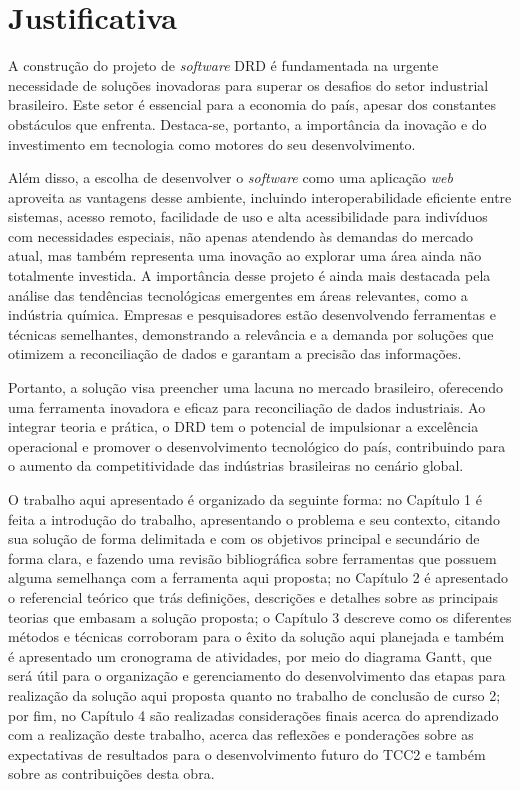 \section{Justificativa}

A construção do projeto de \textit{software} DRD é fundamentada na urgente necessidade de soluções inovadoras para superar os desafios do setor industrial brasileiro. Este setor é essencial para a economia do país, apesar dos constantes obstáculos que enfrenta. Destaca-se, portanto, a importância da inovação e do investimento em tecnologia como motores do seu desenvolvimento.

Além disso, a escolha de desenvolver o \textit{software} como uma aplicação \textit{web} aproveita as vantagens desse ambiente, incluindo interoperabilidade eficiente entre sistemas, acesso remoto, facilidade de uso e alta acessibilidade para indivíduos com necessidades especiais, não apenas atendendo às demandas do mercado atual, mas também representa uma inovação ao explorar uma área ainda não totalmente investida. A importância desse projeto é ainda mais destacada pela análise das tendências tecnológicas emergentes em áreas relevantes, como a indústria química. Empresas e pesquisadores estão desenvolvendo ferramentas e técnicas semelhantes, demonstrando a relevância e a demanda por soluções que otimizem a reconciliação de dados e garantam a precisão das informações.

Portanto, a solução visa preencher uma lacuna no mercado brasileiro, oferecendo uma ferramenta inovadora e eficaz para reconciliação de dados industriais. Ao integrar teoria e prática, o DRD tem o potencial de impulsionar a excelência operacional e promover o desenvolvimento tecnológico do país, contribuindo para o aumento da competitividade das indústrias brasileiras no cenário global.

O trabalho aqui apresentado é organizado da seguinte forma: no Capítulo 1 é feita a introdução do trabalho, apresentando o problema e seu contexto, citando sua solução de forma delimitada e com os objetivos principal e secundário de forma clara, e fazendo uma revisão bibliográfica sobre ferramentas que possuem alguma semelhança com a ferramenta aqui proposta; no Capítulo 2 é apresentado o referencial teórico que trás definições, descrições e detalhes sobre as principais teorias que embasam a solução proposta; o Capítulo 3 descreve como os diferentes métodos e técnicas corroboram para o êxito da solução aqui planejada e também é apresentado um cronograma de atividades, por meio do diagrama Gantt, que será útil para o organização e gerenciamento do desenvolvimento das etapas para realização da solução aqui proposta quanto no trabalho de conclusão de curso 2; por fim, no Capítulo 4 são realizadas considerações finais acerca do aprendizado com a realização deste trabalho, acerca das reflexões e ponderações sobre as expectativas de resultados para o desenvolvimento futuro do TCC2 e também sobre as contribuições desta obra.